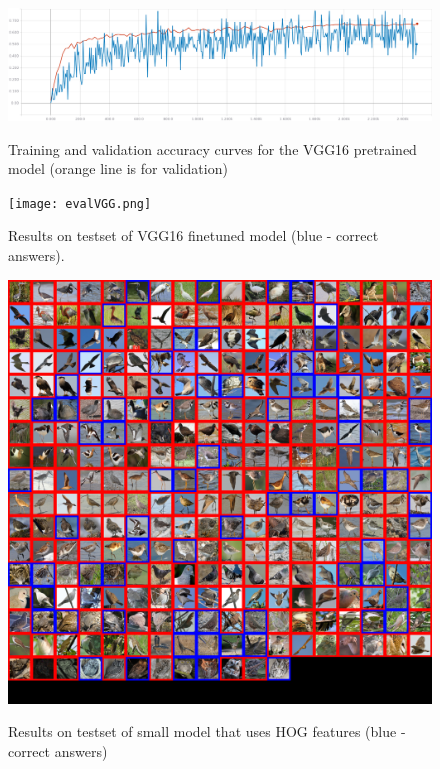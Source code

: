 \documentclass[a4paper]{article}
\begin{document}
\begin{figure}[H]
    \caption[]{Training and validation accuracy curves for the VGG16 pretrained model (orange line is for validation)}
    \centering
    \includegraphics[page=2,width=1.0\textwidth]{vggTraining_accuracy.png}
    \label{fig:trainingVGG_accuracy}
\end{figure}



\begin{figure}[h]
    \caption[]{Results on testset of VGG16 finetuned model (blue - correct answers).}
    \centering
    \texttt{[image: evalVGG.png]}
    \label{fig:evalVGG}
\end{figure}

\begin{figure}[h]
    \caption[]{Results on testset of small model that uses HOG features (blue - correct answers)}
    \centering
    \includegraphics[page=2,width=1.0\textwidth]{eval.png}
    \label{fig:eval}
\end{figure}
\end{document}
